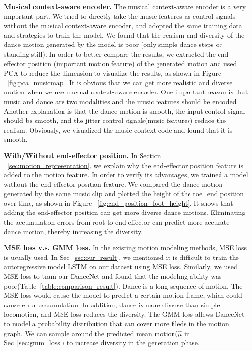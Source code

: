 \textbf{Musical context-aware encoder.}
The musical context-aware encoder is a very important part. We tried to directly take the music features as 
control signals without the musical context-aware encoder, 
and adopted the same training data and strategies to train the model. 
We found that the realism and diversity of the dance motion generated by the model is poor (only simple dance steps or standing still).
In order to better compare the results, 
we extracted the end-effector position (important motion feature) of the generated motion and 
used PCA to reduce the dimension
to visualize the results,  as shown in Figure ~\ref{fig:pca_musicmap}.
It is obvious that we can get more realistic and diverse motion when we use musical context-aware encoder. One important reason is that music and dance are two modalities and the music features should be encoded. Another explanation is that the dance motion is smooth, the input control signal should be smooth, and the jitter control signals(music features) reduce the realism. Obviously, we visualized the music-context-code and found that it is smooth.






\textbf{With/Without end-effector position.}
In Section ~\ref{sec:motion_representation}, we explain why the end-effector position feature is added to the motion feature.
 In order to verify its advantages, we trained a model without the end-effector position 
 feature. 
We compared the dance motion generated by the same music clip and plotted the height of 
 the toe\_end position over time, as shown in Figure ~\ref{fig:end_position_foot_height}.
It shows that adding the end-effector position can get more diverse dance motions. Eliminating the accumulation errors from root to end-effector can predict more accurate dance motion, thereby increasing the diversity.


\textbf{MSE loss v.s. GMM loss.} 
In the existing motion modeling methods\cite{li2017auto}\cite{lee2018interactive}, MSE loss is usually used. In Sec~\ref{sec:our_result}, we mentioned it is difficult to train the autoregressive model LSTM on our dataset using MSE loss. Similarly, we used MSE loss to train our DanceNet and found that the modeling ability was poor(Table~\ref{table:comparison_result}). Dance is a long sequence of motion. The MSE loss would cause the model to predict a certain motion frame, which could cause error accumulation. In addition, dance is more diverse than simple locomotion, and MSE loss reduces the diversity. The GMM loss allows DanceNet to model a probability distribution that can cover more fileds in the motion graph. We can sample around the predicted mean motion($\hat{\mu }$ in Sec~\ref{sec:gmm_loss}) to increase diversity in the generation phase.